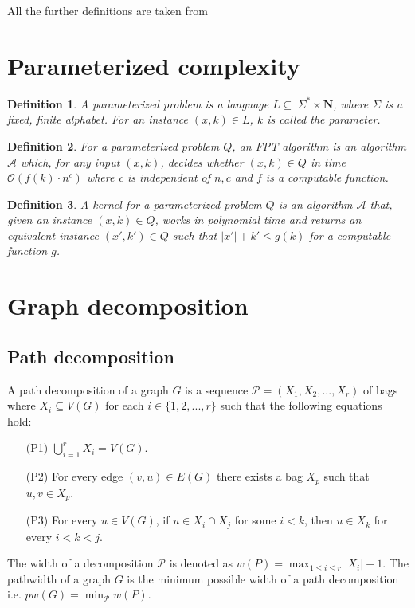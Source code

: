 \documentclass[en]{pracamgr}
\newtheorem{defi}{Definition}
\begin{document}
All the further definitions are taken from 

\section{Parameterized complexity}

\begin{defi}\label{Parameterized problem}
	A parameterized problem is a language $L \subseteq \ \Sigma^* \times \mathbf{N}$, where $\Sigma$ is a fixed, finite alphabet. For an instance $(x,k) \in L$, $k$ is called the parameter.
\end{defi}

\begin{defi}\label{FPT algorithm}
	For a parameterized problem $Q$, an FPT algorithm is an algorithm $\mathcal{A}$ which, for any input $(x,k)$, decides whether $(x,k) \in Q$ in time $\mathcal{O}(f(k)\cdot n^c)$ where c is independent of $n,c$ and $f$ is a computable function.
\end{defi}

\begin{defi}\label{Kernel}
	A kernel for a parameterized problem $Q$ is an algorithm $\mathcal{A}$ that, given an instance $(x,k) \in Q$, works in polynomial time and returns an equivalent instance $(x',k') \in Q$
	such that $|x'| + k' \leq g(k)$ for a computable function $g$.
\end{defi}

\section{Graph decomposition}

\subsection{Path decomposition}

A path decomposition of a graph $G$ is a sequence $\mathcal{P} = (X_1, X_2, ..., X_r)$ of bags where $X_i \subseteq V(G)$ for each $i \in \{1,2, ..., r\}$ such that the following equations hold:
\begin{itemize}
	\item[(P1)] $\bigcup^r_{i=1} X_i = V(G)$.
	\item[(P2)] For every edge $(v,u) \in E(G)$ there exists a bag $X_p$ such that $u,v \in X_p$.
	\item[(P3)] For every $u \in V(G)$, if $u \in X_i \cap X_j$ for some $i < k$, then $u \in X_k$ for every $i < k < j$.
\end{itemize}
The width of a decomposition $\mathcal{P}$ is denoted as $w(P) = \max_{1\leq i\leq r} |X_i| - 1$. The pathwidth of a graph $G$ is the minimum possible width of a path decomposition i.e. $pw(G) = \min_{\mathcal{P}} w(P)$.\\
\end{document}
